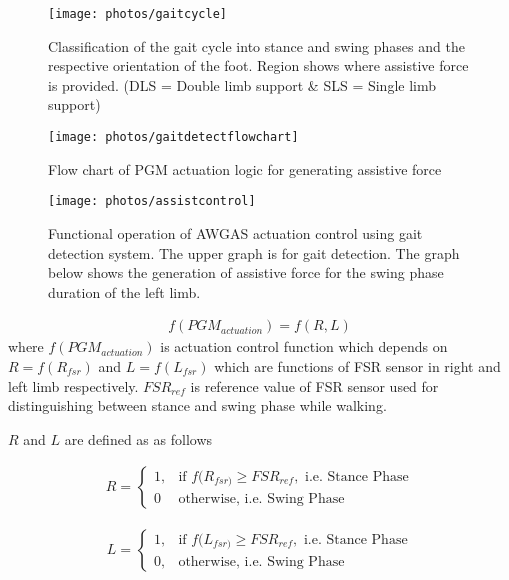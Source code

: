 \documentclass[paper,JRM,paper]{jaciiiarticle}
\begin{document}
\begin{figure}[h]
	\centering
	\texttt{[image: photos/gaitcycle]}
	\caption{Classification of the gait cycle into stance and swing phases and the respective orientation of the foot. Region shows where assistive force is provided. (DLS = Double limb support \& SLS = Single limb support) }
	\label{fig:gaitcycle}
\end{figure}

\begin{figure}[h]
	\centering
	\texttt{[image: photos/gaitdetectflowchart]}
	\caption{Flow chart of PGM actuation logic for generating assistive force}
	\label{fig:gaitdetectflowchart}
\end{figure}

\begin{figure}
	\centering
	\texttt{[image: photos/assistcontrol]}
	\caption{Functional operation of AWGAS actuation control using gait detection system. The upper graph is for gait detection. The graph below shows the generation of assistive force for the swing phase duration of the left limb.}
	\label{fig:assistcontrol}
\end{figure}

\begin{align}\label{eq:actu1}
f(PGM_{actuation}) = f(R,L)
\end{align}
where
$f(PGM_{actuation})$ is actuation control function which depends on $R = f(R_{fsr})$ and $L = f(L_{fsr})$ which are functions of FSR sensor in right and left limb respectively. 
$FSR_{ref}$ is reference value of FSR sensor used for distinguishing between stance and swing phase while walking. 	

$R$ and $L$ are defined as as follows

\begin{align}\label{eq:rfsr}
R= ^{}
\begin{cases}
1,& \text{if } f(R_{fsr)} \geq FSR_{ref}, \text{  i.e. Stance Phase}\\
0              & \text{otherwise, i.e. Swing Phase}
\end{cases}
\end{align}

\begin{align}\label{eq:lfsr}
L= ^{}
\begin{cases}
1,& \text{if } f(L_{fsr)} \geq FSR_{ref}, \text{  i.e. Stance Phase}\\
0,              & \text{otherwise, i.e. Swing Phase}
\end{cases}
\end{align}
\end{document}
